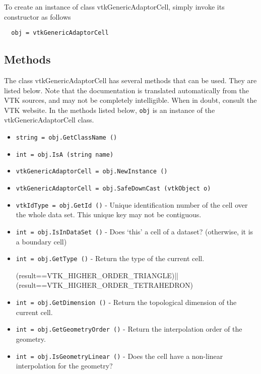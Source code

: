To create an instance of class vtkGenericAdaptorCell, simply
invoke its constructor as follows
\begin{verbatim}
  obj = vtkGenericAdaptorCell
\end{verbatim}
\subsection{Methods}

The class vtkGenericAdaptorCell has several methods that can be used.
  They are listed below.
Note that the documentation is translated automatically from the VTK sources,
and may not be completely intelligible.  When in doubt, consult the VTK website.
In the methods listed below, \verb|obj| is an instance of the vtkGenericAdaptorCell class.
\begin{itemize}
\item  \verb|string = obj.GetClassName ()|

\item  \verb|int = obj.IsA (string name)|

\item  \verb|vtkGenericAdaptorCell = obj.NewInstance ()|

\item  \verb|vtkGenericAdaptorCell = obj.SafeDownCast (vtkObject o)|

\item  \verb|vtkIdType = obj.GetId ()| -  Unique identification number of the cell over the whole
 data set. This unique key may not be contiguous.

\item  \verb|int = obj.IsInDataSet ()| -  Does `this' a cell of a dataset? (otherwise, it is a boundary cell)

\item  \verb|int = obj.GetType ()| -  Return the type of the current cell.
 
       (result==VTK\_HIGHER\_ORDER\_TRIANGLE)||
       (result==VTK\_HIGHER\_ORDER\_TETRAHEDRON)

\item  \verb|int = obj.GetDimension ()| -  Return the topological dimension of the current cell.
 

\item  \verb|int = obj.GetGeometryOrder ()| -  Return the interpolation order of the geometry.
 

\item  \verb|int = obj.IsGeometryLinear ()| -  Does the cell have a non-linear interpolation for the geometry?
 


\end{itemize}
